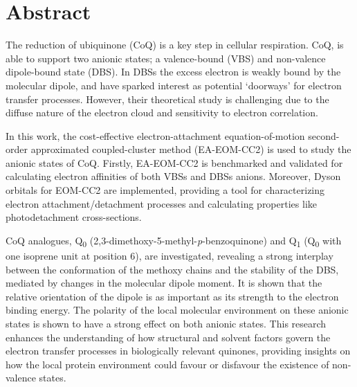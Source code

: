 \chapter*{Abstract}                                 \label{ch:abstract}


The reduction of ubiquinone (CoQ) is a key step in cellular respiration. CoQ, is able to support two anionic states; a valence-bound (VBS) and non-valence dipole-bound state (DBS). In DBSs the excess electron is weakly bound by the molecular dipole, and have sparked interest as potential `doorways' for electron transfer processes. However, their theoretical study is challenging due to the diffuse nature of the electron cloud and sensitivity to electron correlation.

In this work, the cost-effective electron-attachment equation-of-motion second-order approximated coupled-cluster method (EA-EOM-CC2) is used to study the anionic states of CoQ. Firstly, EA-EOM-CC2 is benchmarked and validated for calculating electron affinities of both VBSs and DBSs anions. Moreover, Dyson orbitals for EOM-CC2 are implemented, providing a tool for characterizing electron attachment/detachment processes and calculating properties like photodetachment cross-sections.

CoQ analogues, Q\textsubscript{0} (2,3-dimethoxy-5-methyl-\textit{p}-benzoquinone) and Q\textsubscript{1} (Q\textsubscript{0} with one isoprene unit at position 6), are investigated, revealing a strong interplay between the conformation of the methoxy chains and the stability of the DBS, mediated by changes in the molecular dipole moment. It is shown that the relative orientation of the dipole is as important as its strength to the electron binding energy. The polarity of the local molecular environment on these anionic states is shown to have a strong effect on both anionic states. This research enhances the understanding of how structural and solvent factors govern the electron transfer processes in biologically relevant quinones, providing insights on how the local protein environment could favour or disfavour the existence of non-valence states.

\cleardoublepage

